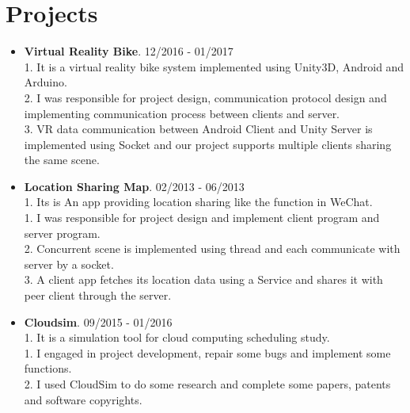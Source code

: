 \documentclass[letterpaper, UTF8]{article}
\begin{document}
	\section*{\textbf{Projects}}
	\begin{itemize}
		\item \textbf{Virtual Reality Bike}. 12/2016 - 01/2017\\
		1. It is a virtual reality bike system implemented using Unity3D, Android and Arduino.\\
		2. I was responsible for project design, communication protocol design and implementing communication process between clients and server.\\
		3. VR data communication between Android Client and Unity Server is implemented using Socket and our project supports multiple clients sharing the same scene.
		
		\item \textbf{Location Sharing Map}. 02/2013 - 06/2013\\
		1. Its is An app providing location sharing like the function in WeChat.\\
		1. I was responsible for project design and implement client program and server program.\\
		2. Concurrent scene is implemented using thread and each communicate with server by a socket.\\
		3. A client app fetches its location data using a Service and shares it with peer client through the server. 
		
		\item \textbf{Cloudsim}. 09/2015 - 01/2016\\
		1. It is a simulation tool for cloud computing scheduling study.\\		
		1. I engaged in project development, repair some bugs and implement some functions.\\
		2. I used CloudSim to do some research and complete some papers, patents and software copyrights.		
		
	\end{itemize}
	\vspace{-0.32in}
	
\end{document}
